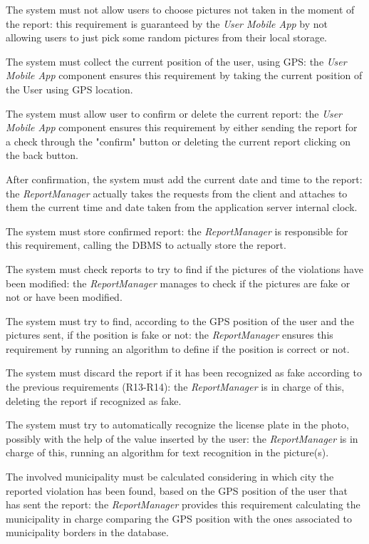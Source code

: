 \documentclass[a4paper]{report}
\begin{document}
\begin{enumerate}[start=1,label={[R\arabic*]}]
\item \label{[R8]}The system must not allow users to choose pictures not taken in the moment of the report: this requirement is guaranteed by the \textit{User Mobile App} by not allowing users to just pick some random pictures from their local storage.
\item \label{[R9]}The system must collect the current position of the user, using GPS: the \textit{User Mobile App} component ensures this requirement by taking the current position of the User using GPS location.
\item \label{[R10]}The system must allow user to confirm or delete the current report: the \textit{User Mobile App} component ensures this requirement by either sending the report for a check through the "confirm" button or deleting the current report clicking on the back button.
\item\label{[R11]} After confirmation, the system must add the current date and time to the report: the \textit{ReportManager} actually takes the requests from the client and attaches to them the current time and date taken from the application server internal clock.
\item \label{[R12]}The system must store confirmed report: the \textit{ReportManager} is responsible for this requirement, calling the DBMS to actually store the report.
\item \label{[R13]}The system must check reports to try to find if the pictures of the violations have been modified: the \textit{ReportManager} manages to check if the pictures are fake or not or have been modified.
\item \label{[R14]}The system must try to find, according to the GPS position of the user and the pictures sent, if the position is fake or not: the \textit{ReportManager} ensures this requirement by running an algorithm to define if the position is correct or not. 
\item \label{[R15]}The system must discard the report if it has been recognized as fake according to the previous requirements (R13-R14): the \textit{ReportManager} is in charge of this, deleting the report if recognized as fake.
\item \label{[R16]}The system must try to automatically recognize the license plate in the photo, possibly with the help of the value inserted by the user: the \textit{ReportManager} is in charge of this, running an algorithm for text recognition in the picture(s).
\item \label{[R17]}The involved municipality must be calculated considering in which city the reported violation has been found, based on the GPS position of the user that has sent the report: the \textit{ReportManager} provides this requirement calculating the municipality in charge comparing the GPS position with the ones associated to municipality borders in the database.

\end{enumerate}
\end{document}
